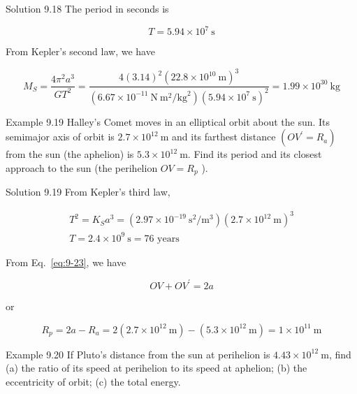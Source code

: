 \documentclass[10pt]{article}
\numberwithin{equation}{section}
\begin{document}
Solution 9.18 The period in seconds is

$$
T=5.94 \times 10^{7} \mathrm{~s}
$$

From Kepler's second law, we have

$$
M_{S}=\frac{4 \pi^{2} a^{3}}{G T^{2}}=\frac{4(3.14)^{2}\left(22.8 \times 10^{10} \mathrm{~m}\right)^{3}}{\left(6.67 \times 10^{-11} \mathrm{~N} \mathrm{~m}^{2} / \mathrm{kg}^{2}\right)\left(5.94 \times 10^{7} \mathrm{~s}\right)^{2}}=1.99 \times 10^{30} \mathrm{~kg}
$$

Example 9.19 Halley's Comet moves in an elliptical orbit about the sun. Its semimajor axis of orbit is $2.7 \times 10^{12} \mathrm{~m}$ and its farthest distance $\left(O V^{\prime}=R_{a}\right)$ from the sun (the aphelion) is $5.3 \times 10^{12} \mathrm{~m}$. Find its period and its closest approach to the sun (the perihelion $O V=R_{p}$ ).

Solution 9.19 From Kepler's third law,

$$
\begin{gathered}
T^{2}=K_{S} a^{3}=\left(2.97 \times 10^{-19} \mathrm{~s}^{2} / \mathrm{m}^{3}\right)\left(2.7 \times 10^{12} \mathrm{~m}\right)^{3} \\
T=2.4 \times 10^{9} \mathrm{~s}=76 \text { years }
\end{gathered}
$$

From Eq.~\eqref{eq:9-23}, we have

$$
O V+O V^{\prime}=2 a
$$

or

$$
R_{p}=2 a-R_{a}=2\left(2.7 \times 10^{12} \mathrm{~m}\right)-\left(5.3 \times 10^{12} \mathrm{~m}\right)=1 \times 10^{11} \mathrm{~m}
$$

Example 9.20 If Pluto's distance from the sun at perihelion is $4.43 \times 10^{12} \mathrm{~m}$, find (a) the ratio of its speed at perihelion to its speed at aphelion; (b) the eccentricity of orbit; (c) the total energy.
\end{document}
